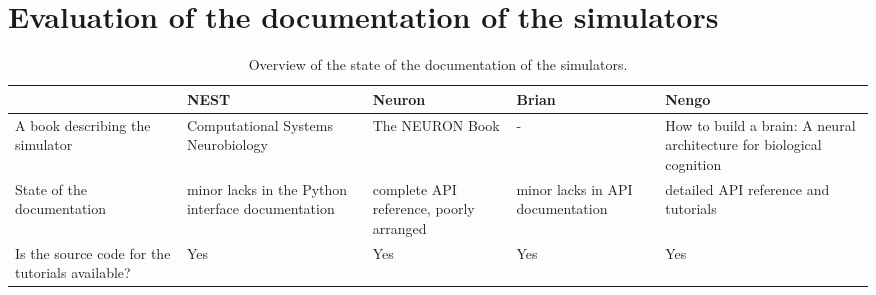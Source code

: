\chapter{Evaluation of the documentation of the simulators}
\begin{table}[htbp]
    \centering
    \begin{sideways}
        \begin{tabularx}{0.7\textheight}{|*{5}{X|}}
            \hline
                 & NEST & Neuron & Brian & Nengo \\
            \hline
                A book describing the simulator & Computational Systems Neurobiology \cite{lenovereComputationalSystemsNeurobiology2012}
                & The NEURON Book \cite{carnevaleNEURONBook06} & - & How to build a brain: A neural architecture for biological cognition \cite{eliasmithHowBuild13} \\
            \hline
                State of the documentation & minor lacks in the Python interface documentation & complete API reference, poorly arranged & minor lacks in API documentation & detailed API reference and tutorials \\
            \hline
                Is the source code for the tutorials available? & Yes & Yes & Yes & Yes \\
            \hline
        \end{tabularx}
    \end{sideways}
    \caption{Overview of the state of the documentation of the simulators. }
    \label{tab:documentation}
\end{table}